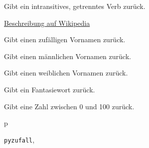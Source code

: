 \documentclass[a4paper,12pt,oneside]{sphinxmanual}
\begin{document}

\begin{fulllineitems}
\label{funktionen:pyzufall.verbt2}
Gibt ein intransitives, getrenntes Verb zurück.

\href{http://de.wikipedia.org/wiki/Transitivität\_(Grammatik)\#Festlegung\_der\_Transitivit.C3.A4t\_eines\_Verbs/}{Beschreibung auf Wikipedia}

\end{fulllineitems}


\begin{fulllineitems}
\label{funktionen:pyzufall.vorname}
Gibt einen zufälligen Vornamen zurück.

\end{fulllineitems}


\begin{fulllineitems}
\label{funktionen:pyzufall.vorname_m}
Gibt einen männlichen Vornamen zurück.

\end{fulllineitems}


\begin{fulllineitems}
\label{funktionen:pyzufall.vorname_w}
Gibt einen weiblichen Vornamen zurück.

\end{fulllineitems}


\begin{fulllineitems}
\label{funktionen:pyzufall.wort}
Gibt ein Fantasiewort zurück.

\end{fulllineitems}


\begin{fulllineitems}
\label{funktionen:pyzufall.zahl}
Gibt eine Zahl zwischen 0 und 100 zurück.

\end{fulllineitems}



\renewcommand{\indexname}{Python-Modulindex}
\begin{theindex}
\def\bigletter#1{{\Large\sffamily#1}\nopagebreak\vspace{1mm}}
\bigletter{p}
\item {\texttt{pyzufall}}, \pageref{funktionen:module-pyzufall}
\end{theindex}

\renewcommand{\indexname}{Stichwortverzeichnis}
\printindex
\end{document}
